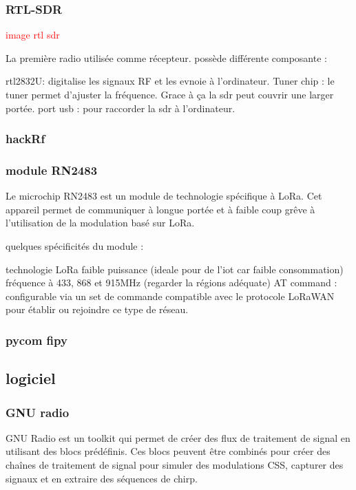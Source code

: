 \documentclass[12pt,a4paper,oneside, titlepage]{report}
\begin{document}
\subsubsection{RTL-SDR}

\textcolor{red}{image rtl sdr}

La première radio utilisée comme récepteur. possède différente composante :

rtl2832U: digitalise les signaux RF et les evnoie à l'ordinateur.
Tuner chip : le tuner permet d'ajuster la fréquence. Grace à ça la sdr peut couvrir une larger portée.
port usb : pour raccorder la sdr à l'ordinateur.

\subsubsection{hackRf}

\subsubsection{module RN2483}

Le microchip RN2483 est un module de technologie spécifique à LoRa. Cet appareil permet de communiquer à longue portée et à faible coup grêve à l'utilisation de la modulation basé sur LoRa.

quelques spécificités du module :

technologie LoRa
faible puissance (ideale pour de l'iot car faible consommation)
fréquence à 433, 868 et 915MHz (regarder la régions adéquate)
AT command : configurable via un set de commande
compatible avec le protocole LoRaWAN pour établir ou rejoindre ce type de réseau.

\subsubsection{pycom fipy}

\subsection{logiciel}

\subsubsection{GNU radio}

GNU Radio est un toolkit qui permet de créer des flux de traitement de signal en utilisant des blocs prédéfinis. Ces blocs peuvent être combinés pour créer des chaînes de traitement de signal pour simuler des modulations CSS, capturer des signaux et en extraire des séquences de chirp.
\end{document}
